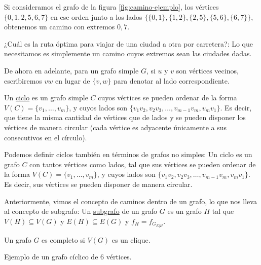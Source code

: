 \begin{ejem}
    Si consideramos el grafo de la figura \ref{fig:camino-ejemplo}, los vértices $\{0,1,2,5,6,7\}$ en ese orden junto a los lados $\{\{0,1\}, \{1,2\}, \{2,5\}, \{5,6\}, \{6,7\}\}$, obtenemos un camino con extremos $0, 7$.
\end{ejem}

\begin{prob}
    ¿Cuál es la ruta óptima para viajar de una ciudad a otra por carretera?: Lo que necesitamos es simplemente un camino cuyos extremos sean las ciudades dadas.
\end{prob}

\begin{notn}
    De ahora en adelante, para un grafo simple $G$, si $u$ y $v$ son vértices vecinos, escribiremos $vw$ en lugar de $\{v,w\}$ para denotar al lado correspondiente.
\end{notn}

\begin{defn}
    Un \ul{ciclo} es un grafo simple $C$ cuyos vértices se pueden ordenar de la forma $V(C) = \{v_1, \dots, v_m\}$, y cuyos lados son $\{v_1v_2, v_2v_3, \dots, v_{m-1}v_m, v_mv_1\}$. Es decir, que tiene la misma cantidad de vértices que de lados y se pueden disponer los vértices de manera circular (cada vértice es adyacente únicamente a sus consecutivos en el círculo).
    
    Podemos definir ciclos también en términos de grafos no simples: Un ciclo es un grafo $C$ con tantos vértices como lados, tal que sus vértices se pueden ordenar de la forma $V(C) = \{v_1, \dots, v_m\}$, y cuyos lados son $\{v_1v_2, v_2v_3, \dots, v_{m-1}v_m, v_mv_1\}$. Es decir, sus vértices se pueden disponer de manera circular.
\end{defn}

\begin{defn}
    Anteriormente, vimos el concepto de caminos dentro de un grafo, lo que nos lleva al concepto de subgrafo: Un \ul{subgrafo} de un grafo $G$ es un grafo $H$ tal que $V(H) \subseteq V(G)$ y $E(H) \subseteq E(G)$ y $f_H = f_{G_{E|H}}$.
\end{defn}

\begin{defn}
    Un grafo $G$ es completo si $V(G)$ es un clique.
\end{defn}

\begin{marginfigure}
    \centering
    \caption{Ejemplo de un grafo cíclico de $6$ vértices.}
\end{marginfigure}

